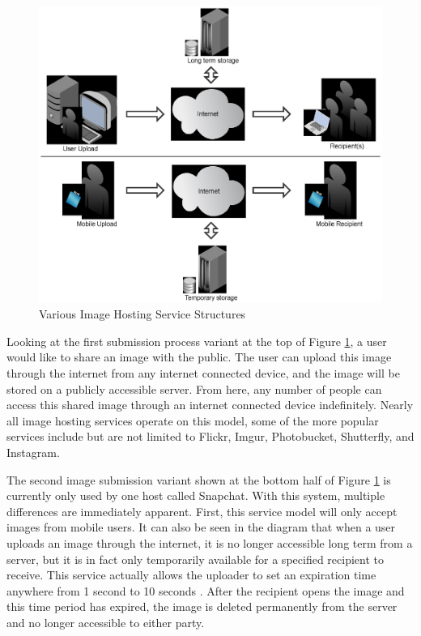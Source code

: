 \begin{figure}[htbp]
\centering
\includegraphics[width=4.5in]{imageshareprocess}
\caption{Various Image Hosting Service Structures}
\label{imageshareprocess}
\end{figure}

Looking at the first submission process variant at the top of Figure \ref{imageshareprocess}, a user would like to share an image with the public. The user can upload this image through the internet from any internet connected device, and the image will be stored on a publicly accessible server. From here, any number of people can access this shared image through an internet connected device indefinitely. Nearly all image hosting services operate on this model, some of the more popular services include but are not limited to Flickr, Imgur, Photobucket, Shutterfly, and Instagram.

The second image submission variant shown at the bottom half of Figure \ref{imageshareprocess} is currently only used by one host called Snapchat. With this system, multiple differences are immediately apparent. First, this service model will only accept images from mobile users. It can also be seen in the diagram that when a user uploads an image through the internet, it is no longer accessible long term from a server, but it is in fact only temporarily available for a specified recipient to receive. This service actually allows the uploader to set an expiration time anywhere from 1 second to 10 seconds \cite{snap:support}. After the recipient opens the image and this time period has expired, the image is deleted permanently from the server and no longer accessible to either party.


